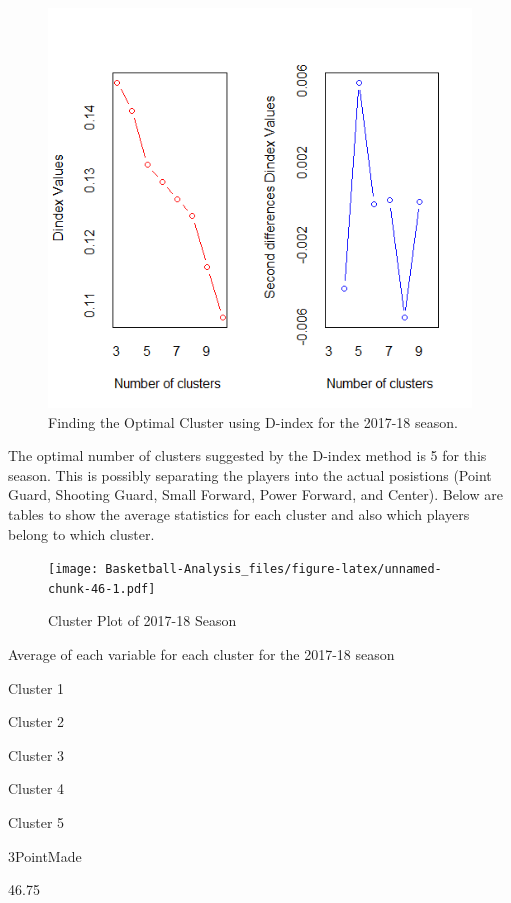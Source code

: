 \documentclass[]{book}
\begin{document}
\begin{figure}
\centering
\includegraphics{images/Dindex2.png}
\caption{Finding the Optimal Cluster using D-index for the 2017-18 season.}
\end{figure}

The optimal number of clusters suggested by the D-index method is 5 for this season. This is possibly separating the players into the actual posistions (Point Guard, Shooting Guard, Small Forward, Power Forward, and Center). Below are tables to show the average statistics for each cluster and also which players belong to which cluster.

\begin{figure}
\centering
\texttt{[image: Basketball-Analysis\_files/figure-latex/unnamed-chunk-46-1.pdf]}
\caption{\label{fig:unnamed-chunk-46}Cluster Plot of 2017-18 Season}
\end{figure}

\label{tab:unnamed-chunk-47}Average of each variable for each cluster for the 2017-18 season

Cluster 1

Cluster 2

Cluster 3

Cluster 4

Cluster 5

3PointMade

46.75
\end{document}
